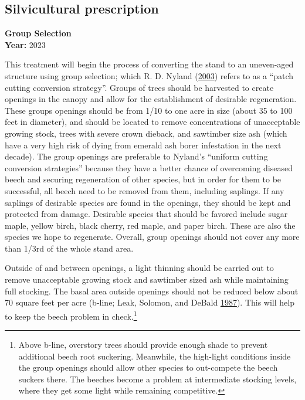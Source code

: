 \documentclass[]{tufte-handout}
\begin{document}
\subsection{Silvicultural
prescription}\label{silvicultural-prescription-2}

\textbf{Group Selection}\\
\noindent \textbf{Year:} 2023

This treatment will begin the process of converting the stand to an
uneven-aged structure using group selection; which R. D. Nyland
(\protect\hyperlink{ref-nyland_even-_2003}{2003}) refers to as a ``patch
cutting conversion strategy''. Groups of trees should be harvested to
create openings in the canopy and allow for the establishment of
desirable regeneration. These groups openings should be from 1/10 to one
acre in size (about 35 to 100 feet in diameter), and should be located
to remove concentrations of unacceptable growing stock, trees with
severe crown dieback, and sawtimber size ash (which have a very high
risk of dying from emerald ash borer infestation in the next decade).
The group openings are preferable to Nyland's ``uniform cutting
conversion strategies'' because they have a better chance of overcoming
diseased beech and securing regeneration of other species, but in order
for them to be successful, all beech need to be removed from them,
including saplings. If any saplings of desirable species are found in
the openings, they should be kept and protected from damage. Desirable
species that should be favored include sugar maple, yellow birch, black
cherry, red maple, and paper birch. These are also the species we hope
to regenerate. Overall, group openings should not cover any more than
1/3rd of the whole stand area. \par Outside of and between openings, a
light thinning should be carried out to remove unacceptable growing
stock and sawtimber sized ash while maintaining full stocking. The basal
area outside openings should not be reduced below about 70 square feet
per acre (b-line; Leak, Solomon, and DeBald
\protect\hyperlink{ref-leak_silvicultural_1987}{1987}). This will help
to keep the beech problem in check.\footnote{Above b-line, overstory
  trees should provide enough shade to prevent additional beech root
  suckering. Meanwhile, the high-light conditions inside the group
  openings should allow other species to out-compete the beech suckers
  there. The beeches become a problem at intermediate stocking levels,
  where they get some light while remaining competitive.}
\end{document}
